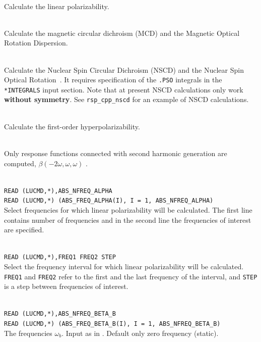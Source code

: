 \begin{description}
\item{} \\
Calculate the linear polarizability.

\item{} \\
Calculate the magnetic circular dichroism (MCD) and the Magnetic Optical Rotation Dispersion.

\item{} \\
Calculate the Nuclear Spin Circular Dichroism (NSCD) and the Nuclear Spin Optical Rotation~\cite{vaara2014}.
It requires specification of the \verb|.PSO| integrals in 
the \verb|*INTEGRALS| input section.
Note that at present NSCD calculations only work {\bf{without symmetry}}.
See \verb|rsp_cpp_nscd| for an example of NSCD calculations.

\item{}\\
Calculate the first-order hyperpolarizability.

\item{}\\
Only response functions connected with second harmonic
generation
are computed, $\beta(-2\omega,\omega,\omega)$ .

\item{} \\
\verb|READ (LUCMD,*),ABS_NFREQ_ALPHA |\\
\verb|READ (LUCMD,*) (ABS_FREQ_ALPHA(I), I = 1, ABS_NFREQ_ALPHA) | \\
Select frequencies for which linear polarizability will be calculated.
The first line contains number of frequencies and in the second line the
frequencies of interest are specified.

\item{} \\
\verb|READ (LUCMD,*),FREQ1 FREQ2 STEP |\\
Select the frequency interval for which linear polarizability will be calculated.
\verb|FREQ1| and \verb|FREQ2| refer to the first and the last frequency of
the interval, and \verb|STEP| is a step between frequencies of interest.

\item{} \\
\verb|READ (LUCMD,*),ABS_NFREQ_BETA_B |\\
\verb|READ (LUCMD,*) (ABS_FREQ_BETA_B(I), I = 1, ABS_NFREQ_BETA_B) | \\
The frequencies
$\omega_b$. Input as in .
Default only zero frequency (static).


\end{description}
